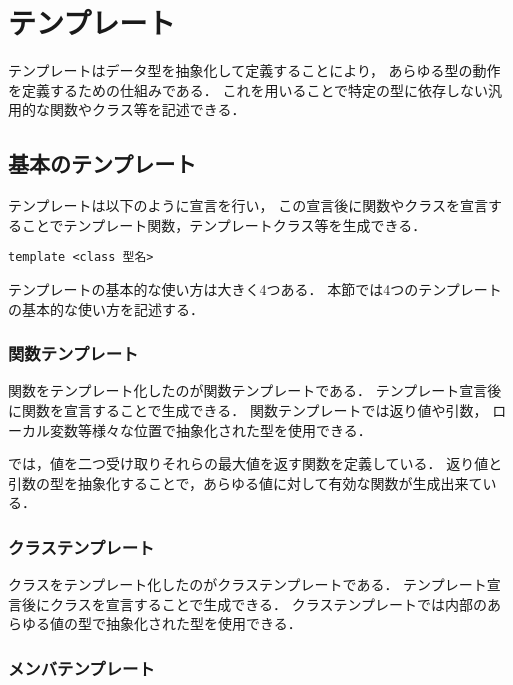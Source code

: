 \section{テンプレート}
テンプレートはデータ型を抽象化して定義することにより，
あらゆる型の動作を定義するための仕組みである．
これを用いることで特定の型に依存しない汎用的な関数やクラス等を記述できる．
\subsection{基本のテンプレート}
テンプレートは以下のように宣言を行い，
この宣言後に関数やクラスを宣言することでテンプレート関数，テンプレートクラス等を生成できる．
\begin{lstlisting}[]
template <class 型名>
\end{lstlisting}

テンプレートの基本的な使い方は大きく4つある．
本節では4つのテンプレートの基本的な使い方を記述する．

\subsubsection*{関数テンプレート}
関数をテンプレート化したのが関数テンプレートである．
テンプレート宣言後に関数を宣言することで生成できる．
関数テンプレートでは返り値や引数，
ローカル変数等様々な位置で抽象化された型を使用できる．

では，値を二つ受け取りそれらの最大値を返す関数を定義している．
返り値と引数の型を抽象化することで，あらゆる値に対して有効な関数が生成出来ている．


\subsubsection*{クラステンプレート}
クラスをテンプレート化したのがクラステンプレートである．
テンプレート宣言後にクラスを宣言することで生成できる．
クラステンプレートでは内部のあらゆる値の型で抽象化された型を使用できる．


\subsubsection*{メンバテンプレート}

